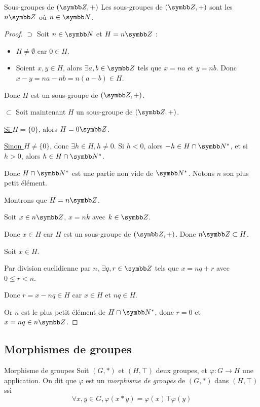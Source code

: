 \begin{theoreme}{Sous-groupes de $(\Z, +)$}{}
    Les sous-groupes de $(\Z, +)$ sont les $n\Z$ où $n \in \N$.
\end{theoreme}


\begin{proof}
    $\supset$ Soit $n \in \N$ et $H = n \Z$ : 
    \begin{itemize}
        \item $H \neq \emptyset$ car $0 \in H$.
        \item Soient $x, y \in H$, alors $\exists a, b \in \Z$ tels que $x = na$ et $y = nb$.
        Donc $x - y = na - nb = n(a - b) \in H$.
    \end{itemize}

    Donc $H$ est un sous-groupe de $(\Z, +)$.

    $\subset$ Soit maintenant $H$ un sous-groupe de $(\Z, +)$. 
    
    \uline{Si $H = \{0\}$}, alors $H = 0 \Z$.

    \uline{Sinon $H \neq \{0\}$}, donc $\exists h \in H, h \neq 0$.
    Si $h < 0$, alors $-h \in H \cap \N^*$, et si $h > 0$, alors $h \in H \cap \N^*$.

    Donc $H \cap \N^*$ est une partie non vide de $\N^*$. Notons $n$ son plus petit élément.

    Montrons que $H = n \Z$.
    
    Soit $x \in n \Z$, $x = nk$ avec $k \in \Z$.

    Donc $x \in H$ car $H$ est un sous-groupe de $(\Z, +)$.
    Donc $n \Z \subset H$.

    Soit $x \in H$. 

    Par division euclidienne par $n$, $\exists q, r \in \Z$ tels que $x = nq + r$ avec $0 \leqslant r < n$.
    
    Donc $r = x - nq \in H$ car $x \in H$ et $nq \in H$.

    Or $n$ est le plus petit élément de $H \cap \N^*$, donc $r = 0$ et $x = nq \in n \Z$.
\end{proof}

\subsection{Morphismes de groupes}

\begin{definition}{Morphisme de groupes}{}
    Soit $(G, \ast)$ et $(H, \top)$ deux groupes, et $\varphi : G \to H$ une application.
    On dit que $\varphi$ est un \emph{morphisme de groupes} de $(G, \ast)$ dans $(H, \top)$ ssi
    \[\forall x, y \in G, \varphi(x \ast y) = \varphi(x) \top \varphi(y)\]
\end{definition}

